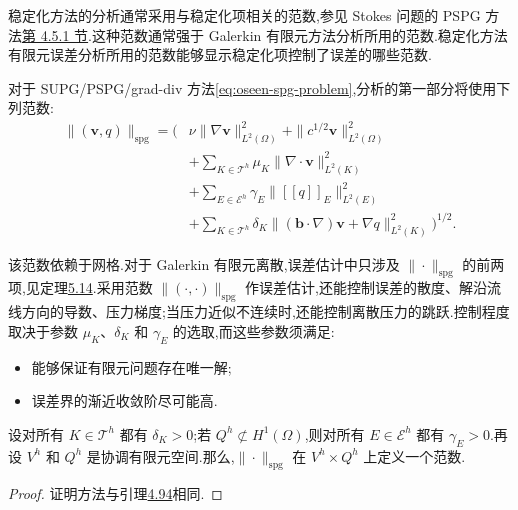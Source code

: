 \begin{note}[分析第一部分所用的范数]\label{note:oseen-spg-first-analysis-norm}
稳定化方法的分析通常采用与稳定化项相关的范数,参见 Stokes 问题的 PSPG 方法\hyperref[sec:stokes-pspg]{第 4.5.1 节}.这种范数通常强于 Galerkin 有限元方法分析所用的范数.稳定化方法有限元误差分析所用的范数能够显示稳定化项控制了误差的哪些范数.

对于 SUPG/PSPG/grad-div 方法\cref{eq:oseen-spg-problem},分析的第一部分将使用下列范数:
\begin{equation}\label{eq:oseen-spg-norm}
\begin{aligned}
 \|(\bm{v},q)\|_{\mathrm{spg}}
  =\Biggl(&\nu\|\nabla\bm{v}\|_{L^2(\Omega)}^2
      +\|c^{1/2}\bm{v}\|_{L^2(\Omega)}^2\\
     &+\sum_{K\in\mathcal{T}^h}
         \mu_K\|\nabla\cdot\bm{v}\|_{L^2(K)}^2\\
     &+\sum_{E\in\mathcal{E}^h}
         \gamma_E\|\left[\!\left[q\right]\!\right]_E\|_{L^2(E)}^2\\
     &+\sum_{K\in\mathcal{T}^h}
         \delta_K\|(\bm{b}\cdot\nabla)\bm{v}
                         +\nabla q\|_{L^2(K)}^2\Biggr)^{1/2}.
\end{aligned}
\end{equation}

该范数依赖于网格.对于 Galerkin 有限元离散,误差估计中只涉及 $\|\cdot\|_{\mathrm{spg}}$ 的前两项,见定理\hyperref[thm:oseen-fem-velocity-error]{5.14}.采用范数 $\|(\cdot,\cdot)\|_{\mathrm{spg}}$ 作误差估计,还能控制误差的散度、解沿流线方向的导数、压力梯度;当压力近似不连续时,还能控制离散压力的跳跃.控制程度取决于参数 $\mu_K$、$\delta_K$ 和 $\gamma_E$ 的选取,而这些参数须满足:
\begin{itemize}
  \item 能够保证有限元问题存在唯一解;
  \item 误差界的渐近收敛阶尽可能高.
\end{itemize}
\end{note}

\begin{lemma}\label{lem:oseen-spg-norm}
设对所有 $K\in\mathcal{T}^h$ 都有 $\delta_K>0$;若 $Q^h\not\subset H^1(\Omega)$,则对所有 $E\in\mathcal{E}^h$ 都有 $\gamma_E>0$.再设 $V^h$ 和 $Q^h$ 是协调有限元空间.那么,$\|\cdot\|_{\mathrm{spg}}$ 在 $V^h\times Q^h$ 上定义一个范数.
\end{lemma}
\begin{proof}
证明方法与引理\hyperref[lem:stokes-pspg-stabilized-norm]{4.94}相同.
\end{proof}

